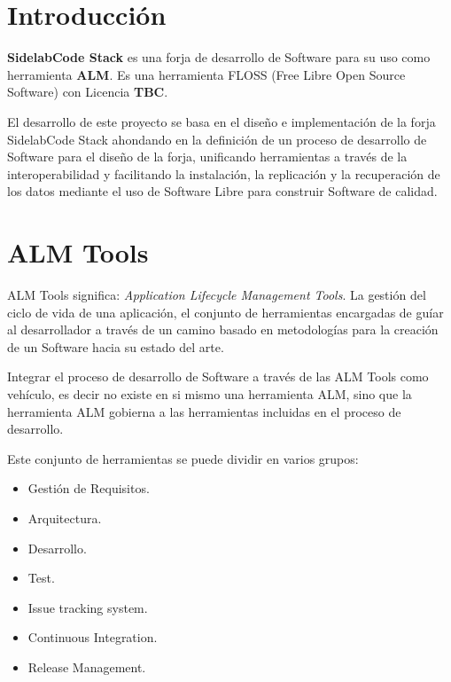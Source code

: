 \documentclass[11pt]{scrartcl}
\begin{document}
\tableofcontents  %

\newpage

\listoffigures  %

\newpage

\listoftables %

\newpage


\section{Introducción}
\label{sec:introducción}

\par \textbf{SidelabCode Stack} es una forja de desarrollo de Software para su uso como herramienta \textbf{ALM}. Es una herramienta FLOSS (Free Libre Open Source Software) con Licencia \textbf{TBC}.

\par El desarrollo de este proyecto se basa en el diseño e implementación de la forja SidelabCode Stack ahondando en la definición de un proceso de desarrollo de Software para el diseño de la forja, unificando herramientas a través de la interoperabilidad y facilitando la instalación, la replicación y la recuperación de los datos mediante el uso de Software Libre para construir Software de calidad.

\section{ALM Tools}
\label{sec:almtools}

\par ALM Tools significa: \emph{Application Lifecycle Management Tools}. La gesti\'on del ciclo de vida de una aplicaci\'on, el conjunto de herramientas encargadas de gu\'iar al desarrollador a trav\'es de un camino basado en metodolog\'ias para la creaci\'on de un Software hacia su estado del arte.

\par Integrar el proceso de desarrollo de Software a trav\'es de las ALM Tools como veh\'iculo, es decir no existe en si mismo una herramienta ALM, sino que la herramienta ALM gobierna a las herramientas incluidas en el proceso de desarrollo.

\par Este conjunto de herramientas se puede dividir en varios grupos:

\begin{itemize}
	\item Gesti\'on de Requisitos.
	\item Arquitectura.
	\item Desarrollo.
	\item Test.
	\item Issue tracking system.
	\item Continuous Integration.
	\item Release Management.
\end{itemize}
\end{document}

